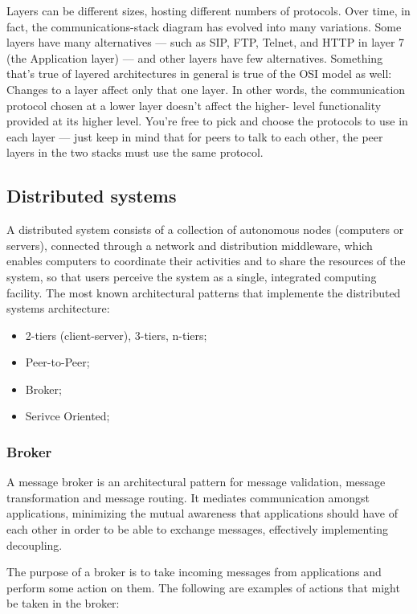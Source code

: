 Layers can be different sizes, hosting different numbers of protocols. Over time, in fact, the communications-stack diagram has evolved into many variations. Some layers have many alternatives — such as SIP, FTP, Telnet, and HTTP in layer 7 (the Application layer) — and other layers have few alternatives.
Something that’s true of layered architectures in general is true of the OSI model as well: Changes to a layer affect only that one layer. In other words, the communication protocol chosen at a lower layer doesn’t affect the higher- level functionality provided at its higher level. You’re free to pick and choose the protocols to use in each layer — just keep in mind that for peers to talk to each other, the peer layers in the two stacks must use the same protocol.

\subsection{Distributed systems}
A distributed system consists of a collection of autonomous nodes (computers or servers), connected through a network and distribution middleware, which enables computers to coordinate their activities and to share the resources of the system, so that users perceive the system as a single, integrated computing facility.
The most known architectural patterns that implemente the distributed systems architecture:
\begin{itemize}
\item 2-tiers (client-server), 3-tiers, n-tiers;
\item Peer-to-Peer;
\item Broker;
\item Serivce Oriented;
\end{itemize}

\subsubsection{Broker}
A message broker is an architectural pattern for message validation, message transformation and message routing. It mediates communication amongst applications, minimizing the mutual awareness that applications should have of each other in order to be able to exchange messages, effectively implementing decoupling.

The purpose of a broker is to take incoming messages from applications and perform some action on them. The following are examples of actions that might be taken in the broker:


